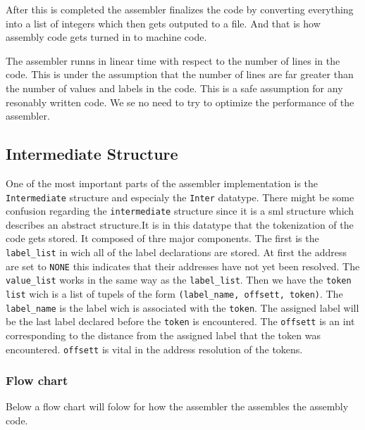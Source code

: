 \documentclass{article}
\newcommand{\V}{\verb}
\begin{document}
After this is completed the assembler finalizes the code by converting
everything into a list of integers which then gets outputed to a file. And that
is how assembly code gets turned in to machine code.

The assembler runns in linear time with respect to the number of lines in the
code. This is under the assumption that the number of lines are far greater than
the number of values and labels in the code. This is a safe assumption for any
resonably written code. We se no need to try to optimize the performance of the
assembler.

\subsection{Intermediate Structure}
One of the most important parts of the assembler implementation is the
\V+Intermediate+ structure and especialy the \V+Inter+ datatype. There might
be some confusion regarding the \V+intermediate+ structure since it is a
sml structure which describes an abstract structure.It is in this datatype that
the tokenization of the code gets stored.
It composed of thre major components. The first is the \V+label_list+ in wich all of the label
declarations are stored. At first the address are set to \V+NONE+ this indicates
that their addresses have not yet been resolved. The \V+value_list+ works in the
same way as the \V+label_list+. Then we have the \V+token list+ wich is a list
of tupels of the form \V+(label_name, offsett, token)+. The \V+label_name+ is
the label wich is associated with the \V+token+. The assigned label will be the
last label declared before the \V+token+ is encountered. The \V+offsett+ is an
int corresponding to the distance from the assigned label that the token was
encountered. \V+offsett+ is vital in the address resolution of the tokens.


\subsubsection{Flow chart}
Below a flow chart will folow for how the assembler the assembles the
assembly code.
\end{document}
